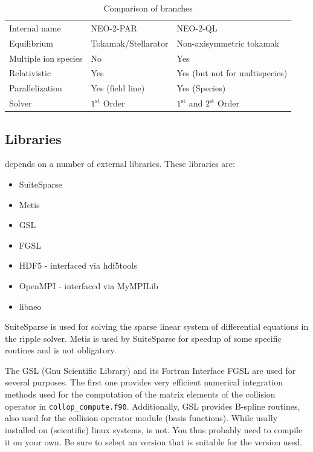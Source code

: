 \documentclass{article}
\newcommand{\vv}[1]{\texttt{\detokenize{#1}}}
\begin{document}
\begin{table}[h]
\centering
\begin{tabular}{lll}
Internal name   & NEO-2-PAR & NEO-2-QL\\
Equilibrium     & Tokamak/Stellarator & Non-axisymmetric tokamak\\
Multiple ion species & No & Yes\\
Relativistic    & Yes & Yes (but not for multispecies)\\
Parallelization & Yes (field line) & Yes (Species)\\
Solver          & $1^\mathrm{st}$ Order & $1^\mathrm{st}$ and $2^\mathrm{st}$ Order%
\end{tabular}
\caption{Comparison of \vv{NEO-2} branches}
\label{tab:neo2branches}
\end{table}

\subsection{Libraries\label{technicalbackground_libraries}}
\vv{NEO-2} depends on a number of external libraries. These libraries
are:
\begin{itemize}
\item SuiteSparse
\item Metis
\item GSL
\item FGSL
\item HDF5 - interfaced via hdf5tools
\item OpenMPI - interfaced via MyMPILib
\item libneo
\end{itemize}

SuiteSparse is used for solving the sparse linear system of differential
equations in the ripple solver. Metis is used by SuiteSparse for speedup
of some specific routines and is not obligatory. 

The GSL (Gnu Scientific Library) and its Fortran Interface FGSL are used
for several purposes. The first one provides very efficient numerical
integration methods used for the computation of the matrix elements of
the collision operator in \verb|collop_compute.f90|. Additionally, GSL
provides B-spline routines, also used for the collision operator module
(basis functions). While \vv{gsl} usally installed on (scientific) linux
systems, \vv{fgsl} is not. You thus probably need to compile it on your
own. Be sure to select an \vv{fgsl} version that is suitable for the
\vv{gsl} version used.
\end{document}
